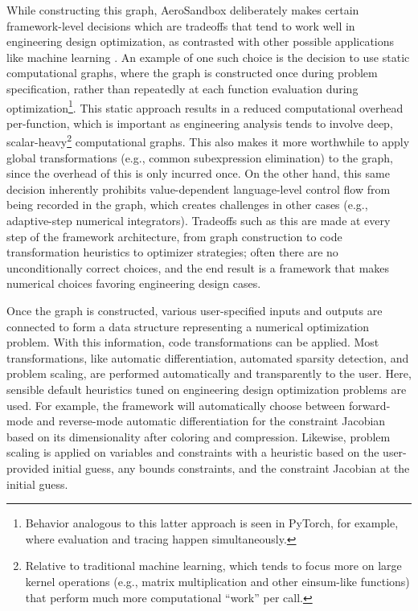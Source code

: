 While constructing this graph, AeroSandbox deliberately makes certain framework-level decisions which are tradeoffs that tend to work well in engineering design optimization, as contrasted with other possible applications like machine learning \cite{rackauckas_engineering_2021}. An example of one such choice is the decision to use static computational graphs, where the graph is constructed once during problem specification, rather than repeatedly at each function evaluation during optimization\footnote{Behavior analogous to this latter approach is seen in PyTorch, for example, where evaluation and tracing happen simultaneously.}. This static approach results in a reduced computational overhead per-function, which is important as engineering analysis tends to involve deep, scalar-heavy\footnote{Relative to traditional machine learning, which tends to focus more on large kernel operations (e.g., matrix multiplication and other einsum-like functions) that perform much more computational ``work'' per call.} computational graphs. This also makes it more worthwhile to apply global transformations (e.g., common subexpression elimination) to the graph, since the overhead of this is only incurred once. On the other hand, this same decision inherently prohibits value-dependent language-level control flow from being recorded in the graph, which creates challenges in other cases (e.g., adaptive-step numerical integrators). Tradeoffs such as this are made at every step of the framework architecture, from graph construction to code transformation heuristics to optimizer strategies; often there are no unconditionally correct choices, and the end result is a framework that makes numerical choices favoring engineering design cases.

Once the graph is constructed, various user-specified inputs and outputs are connected to form a data structure representing a numerical optimization problem. With this information, code transformations can be applied. Most transformations, like automatic differentiation, automated sparsity detection, and problem scaling, are performed automatically and transparently to the user. Here, sensible default heuristics tuned on engineering design optimization problems are used. For example, the framework will automatically choose between forward-mode and reverse-mode automatic differentiation for the constraint Jacobian based on its dimensionality after coloring and compression. Likewise, problem scaling is applied on variables and constraints with a heuristic based on the user-provided initial guess, any bounds constraints, and the constraint Jacobian at the initial guess.

